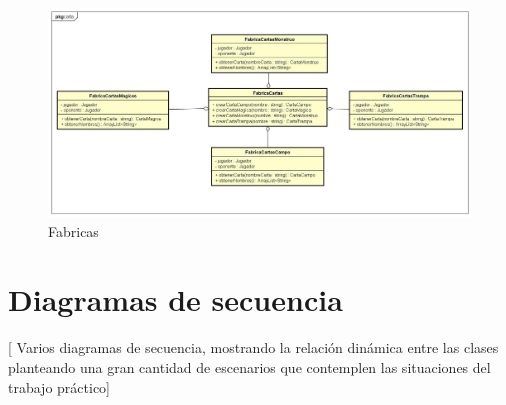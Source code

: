 \begin{figure}[H]
	\centering
	\includegraphics[scale=0.3]{includes/Fabricas}
	\caption{Fabricas}
	\label{Fabricas}
\end{figure}

\clearpage
\section{Diagramas de secuencia}

[ Varios diagramas de secuencia, mostrando la relación dinámica entre las
clases planteando una gran cantidad de escenarios que contemplen las
situaciones del trabajo práctico]

